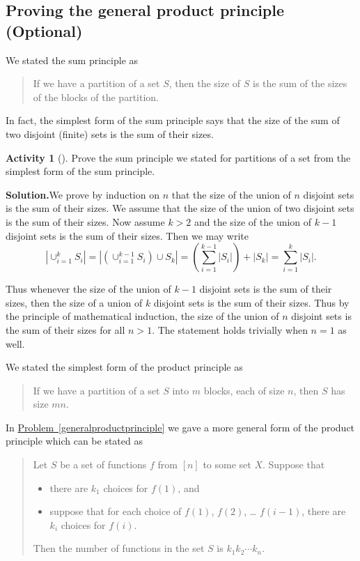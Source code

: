 \documentclass[10pt,]{book}
\theoremstyle{plain}
\theoremstyle{definition}
\newtheorem{activity}[project]{Activity}
\numberwithin{equation}{chapter}
\begin{document}
\subsection[{Proving the general product principle (Optional)}]{Proving the general product principle (Optional)}\label{subsection-14}
We stated the sum principle as%
\begin{quote}If we have a partition of a set \(S\), then the size of \(S\) is the sum of the sizes of the blocks of the partition.\end{quote}
In fact, the simplest form of the sum principle says that the size of the sum of two disjoint (finite) sets is the sum of their sizes.%
\begin{activity}[]\label{activity-77}
Prove the sum principle we stated for partitions of a set from the simplest form of the sum principle.%
\par\medskip\noindent%
\textbf{Solution.}\quad We prove by induction on \(n\) that the size of the union of \(n\) disjoint sets is the sum of their sizes. We assume that the size of the union of two disjoint sets is the sum of their sizes. Now assume \(k>2\) and the size of the union of \(k-1\) disjoint sets is the sum of their sizes. Then we may write%
\begin{equation*}
|\cup_{i=1}^k S_i|=|\left(\cup_{i=1}^{k-1}S_i\right)\cup
S_k|=\left(\sum_{i=1}^{k-1}|S_i|\right) +|S_k|=\sum_{i=1}^k|S_i|.
\end{equation*}
%
\par
Thus whenever the size of the union of \(k-1\) disjoint sets is the sum of their sizes, then the size of a union of \(k\) disjoint sets is the sum of their sizes. Thus by the principle of mathematical induction, the size of the union of \(n\) disjoint sets is the sum of their sizes for all \(n>1\). The statement holds trivially when \(n=1\) as well.%
\end{activity}
We stated the simplest form of the product principle as%
\begin{quote}If we have a partition of a set \(S\) into \(m\) blocks, each of size \(n\), then \(S\) has size \(mn\).\end{quote}
In \hyperref[generalproductprinciple]{Problem~\ref{generalproductprinciple}} we gave a more general form of the product principle which can be stated as %
\begin{quote}Let \(S\) be a set of functions \(f\) from \([n]\) to some set \(X\).  Suppose that \leavevmode%
\begin{itemize}[label=\textbullet]
\item{}there are \(k_1\) choices for \(f(1)\), and%
\item{}suppose that for each choice of \(f(1)\), \(f(2)\), \dots{} \(f(i-1)\), there are \(k_i\) choices for \(f(i)\).%
\end{itemize}
 Then the number of functions in the set \(S\) is \(k_1k_2\cdots k_n\).\end{quote}
\end{document}
